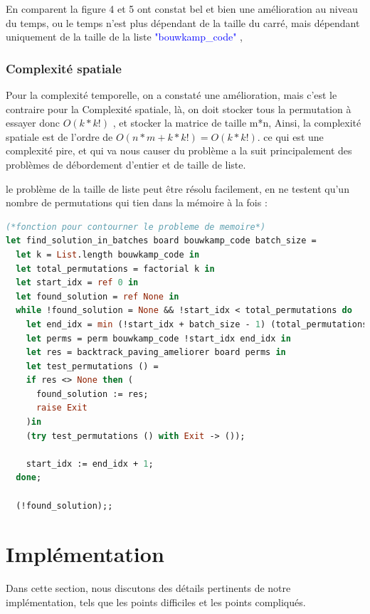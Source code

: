 \documentclass{article}
\begin{document}
En comparent la figure 4 et 5 ont constat bel et bien une amélioration au niveau du temps, ou le temps n'est plus dépendant de la taille du carré, mais dépendant uniquement de la taille de la liste \textcolor{blue}{"bouwkamp\_code"} ,


\subsubsection{Complexité spatiale}
Pour la complexité temporelle, on a constaté une amélioration, mais c'est le contraire pour la Complexité spatiale, là, on doit stocker tous la permutation à essayer donc $O(k*k!)$ , et stocker la matrice de taille m*n, Ainsi, la complexité
spatiale est de l’ordre de $O(n * m + k*k!) = O(k*k!)$.\newline
ce qui est une complexité pire,  et qui va nous causer du problème a la suit principalement des problèmes de débordement d'entier et de taille de liste.\newline

le problème de la taille de liste peut être résolu facilement, en ne testent qu'un nombre de permutations qui tien dans la mémoire à la fois :

\begin{lstlisting}[language=Caml]
(*fonction pour contourner le probleme de memoire*)
let find_solution_in_batches board bouwkamp_code batch_size =
  let k = List.length bouwkamp_code in
  let total_permutations = factorial k in
  let start_idx = ref 0 in
  let found_solution = ref None in
  while !found_solution = None && !start_idx < total_permutations do
    let end_idx = min (!start_idx + batch_size - 1) (total_permutations - 1) in
    let perms = perm bouwkamp_code !start_idx end_idx in
    let res = backtrack_paving_ameliorer board perms in
    let test_permutations () =
    if res <> None then (
      found_solution := res;
      raise Exit
    )in
    (try test_permutations () with Exit -> ());

    start_idx := end_idx + 1;
  done;

  (!found_solution);;
\end{lstlisting}

\section{Implémentation}

Dans cette section, nous discutons des détails pertinents de notre implémentation, tels que les points difficiles et les points compliqués.
\end{document}
